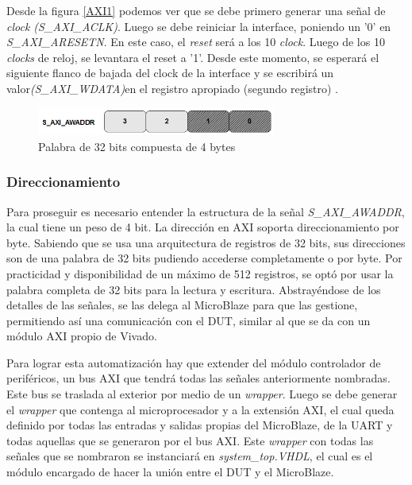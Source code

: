 \documentclass[a4paper,openright,12pt]{report}
\begin{document}
Desde la figura \ref{AXI1} podemos ver que se debe primero generar una señal de \textit{clock (S\_AXI\_ACLK)}. Luego se debe reiniciar la interface, poniendo un '0' en \textit{S\_AXI\_ARESETN}. En este caso, el \textit{reset} será a los 10 \textit{clock}. Luego de los 10 \textit{clocks} de reloj, se levantara el reset a '1'. Desde este momento, se esperará el siguiente flanco de bajada del clock de la interface y se escribirá  un valor\textit{(S\_AXI\_WDATA)}en el registro apropiado (segundo registro) .

\begin{figure}[H]
	\centering
	\includegraphics[width=0.70\textwidth]{img/xiawaddr.png}
	\caption{Palabra de 32 bits compuesta de 4 bytes}
	\label{AXI}
    \end{figure}
    
    \subsubsection{Direccionamiento}
    Para proseguir es necesario entender la estructura de la señal \textit{S\_AXI\_AWADDR}, la cual tiene un peso de 4 bit. La dirección en AXI soporta direccionamiento por byte. Sabiendo que se usa una arquitectura de registros de 32 bits, sus direcciones son de una palabra de 32 bits pudiendo accederse completamente o por byte. Por practicidad y disponibilidad de un máximo de 512 registros, se optó por usar la palabra completa de 32 bits para la lectura y escritura. Abstrayéndose de los detalles de las señales, se las delega al  MicroBlaze para que las gestione,  permitiendo así una comunicación con el  DUT,  similar al que se da con  un módulo AXI propio de Vivado.
    
 Para lograr esta automatización  hay que extender del módulo controlador de periféricos,  un bus AXI que tendrá todas las señales anteriormente nombradas. Este bus se traslada al exterior por medio de un \textit{wrapper}.  Luego se debe generar el \textit{wrapper} que contenga al microprocesador y a la extensión AXI, el cual queda definido por todas las entradas y salidas propias del MicroBlaze, de la UART y todas aquellas que se generaron por el bus AXI. 
    Este \textit{wrapper} con todas las señales que se  nombraron se  instanciará  en \textit{system\_top.VHDL}, el cual es el módulo encargado de hacer la unión entre el DUT y el MicroBlaze.
    
\end{document}
